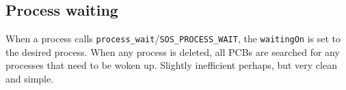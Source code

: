 \documentclass[12pt,english]{article}
\begin{document}
\subsection{Process waiting}

When a process calls \texttt{process\_wait}/\texttt{SOS\_PROCESS\_WAIT}, the \texttt{waitingOn} is set to the desired process.  When any process is deleted, all PCBs are searched for any processes that need to be woken up.  Slightly inefficient perhaps, but very clean and simple.
\end{document}
